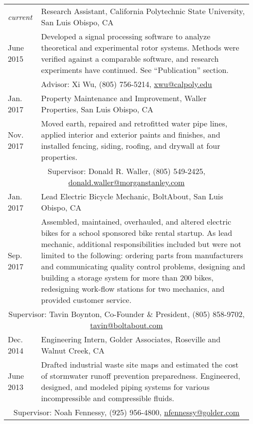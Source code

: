 \documentclass[10pt]{article} %
\newcommand{\catspace}{.4em}
\begin{document}
	\begin{tabular}{p{.6in}|p{5.5in}}
		\emph{current}& Research Assistant, California Polytechnic State University, San Luis Obispo, CA \\
		June 2015& \footnotesize{Developed a signal processing software to analyze theoretical and experimental rotor systems. Methods were verified against a comparable software, and research experiments have continued. See ``Publication'' section.}\\
		\multicolumn{2}{c}{\footnotesize{\hfill Advisor: Xi Wu, (805) 756-5214, \href{mailto:xwu@calpoly.edu}{xwu@calpoly.edu}}} \\	[\catspace]	
		
		Jan. 2017& Property Maintenance and Improvement, Waller Properties, San Luis Obispo, CA\\
		Nov. 2017& \footnotesize{Moved earth, repaired and retrofitted water pipe lines, applied interior and exterior paints and finishes, and installed fencing, siding, roofing, and drywall at four properties.}\\
		\multicolumn{2}{c}{\footnotesize{ \hfill Supervisor: Donald R. Waller, (805) 549-2425, \href{mailto:donald.waller@morganstanley.com}{donald.waller@morganstanley.com}}} \\[\catspace]
		
		Jan. 2017& Lead Electric Bicycle Mechanic, BoltAbout, San Luis Obispo, CA\\
		Sep. 2017& \footnotesize{Assembled, maintained, overhauled, and altered electric bikes for a school sponsored bike rental startup. As lead mechanic, additional responsibilities included but were not limited to the following: ordering parts from manufacturers and communicating quality control problems, designing and building a storage system for more than 200 bikes, redesigning work-flow stations for two mechanics, and provided customer service.}\\
		\multicolumn{2}{c}{\footnotesize{\hfill Supervisor: Tavin Boynton, Co-Founder \& President, (805) 858-9702, \href{mailto:tavin@boltabout.com}{tavin@boltabout.com}}} \\[\catspace]
		
		Dec. 2014& Engineering Intern, Golder Associates, Roseville and Walnut Creek, CA \\
		June 2013&\footnotesize{ Drafted industrial waste site maps and estimated the cost of stormwater runoff prevention preparedness. Engineered, designed, and modeled piping systems for various incompressible and compressible fluids. }\\
		\multicolumn{2}{c}{\footnotesize{\hfill Supervisor: Noah Fennessy, (925) 956-4800, \href{nfennessy@golder.com}{nfennessy@golder.com}}} \\	[\catspace]	
		

\end{tabular}
\end{document}
